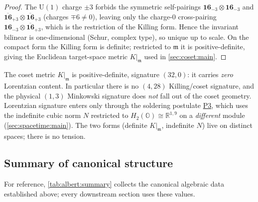 \begin{proof}
The $\mathrm{U}(1)$ charge $\pm3$ forbids the symmetric self-pairings
$\mathbf{16}_{-3}\!\otimes\!\mathbf{16}_{-3}$ and
$\overline{\mathbf{16}}_{+3}\!\otimes\!\overline{\mathbf{16}}_{+3}$
(charges $\mp6\neq0$), leaving only the charge-$0$ cross-pairing
$\mathbf{16}_{-3}\!\otimes\!\overline{\mathbf{16}}_{+3}$, which is the
restriction of the Killing form. Hence the invariant bilinear is
one-dimensional (Schur, complex type), so unique up to scale. On the
compact form the Killing form is definite; restricted to $\mathfrak{m}$
it is positive-definite, giving the Euclidean target-space metric
$K|_{\mathfrak{m}}$ used in \autoref{sec:coset:main}.
\end{proof}

\begin{remark}\label{rmk:albert:nolorentz}
The coset metric $K|_{\mathfrak{m}}$ is positive-definite, signature
$(32,0)$: it carries \emph{zero} Lorentzian content. In particular there
is no $(4,28)$ Killing/coset signature, and the physical $(1,3)$ Minkowski
signature does \emph{not} fall out of the coset geometry. Lorentzian
signature enters only through the soldering postulate
\hyperref[post:spacetime:P3master]{P3}, which uses the indefinite cubic norm
$N$ restricted to $H_{2}(\mathbb{O})\cong\mathbb{R}^{1,9}$ on a
\emph{different} module (\autoref{sec:spacetime:main}). The two forms
(definite $K|_{\mathfrak{m}}$, indefinite $N$) live on distinct spaces;
there is no tension.
\end{remark}

\subsection{Summary of canonical structure}
\label{sec:albert:summary}

For reference, \autoref{tab:albert:summary} collects the canonical
algebraic data established above; every downstream section uses these
values.

